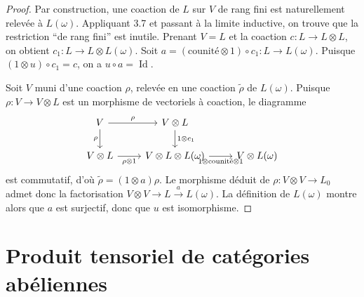 \documentclass[12pt,a4paper]{article}
\theoremstyle{plain}
\theoremstyle{definition}
\theoremstyle{remark}
\DeclareMathOperator{\Id}{Id}
\begin{document}
\begin{proof}
Par construction, une coaction de $L$ sur $V$ de rang fini est naturellement relevée à $L(\omega)$. Appliquant 3.7 et passant à la limite inductive, on trouve que la restriction ``de rang fini'' est inutile. Prenant $V = L$ et la coaction $c : L \to L \otimes L$, on obtient $c_1 : L \to L \otimes L(\omega)$. Soit $a = (\text{counité} \otimes 1) \circ c_1 : L \to L(\omega)$. Puisque $(1 \otimes u) \circ c_1 = c$, on a $u \circ a = \Id$.

Soit $V$ muni d'une coaction $\rho$, relevée en une coaction $\tilde{\rho}$ de $L(\omega)$. Puisque $\rho : V \to V \otimes L$ est un morphisme de vectoriels à coaction, le diagramme
\[
\begin{tikzcd}
V \arrow[r, "\rho"] \arrow[d, "\rho"'] & V \otimes L \arrow[d, "1 \otimes c_1"] \\
V \otimes L \arrow[r, "\rho \otimes 1"'] & V \otimes L \otimes L(\omega) \arrow[r, "1 \otimes \text{counité} \otimes 1"'] & V \otimes L(\omega)
\end{tikzcd}
\]
est commutatif, d'où $\tilde{\rho} = (1 \otimes a)\rho$. Le morphisme déduit de $\rho : V \otimes V \to L_0$ admet donc la factorisation $V \otimes V \to L \xrightarrow{a} L(\omega)$. La définition de $L(\omega)$ montre alors que $a$ est surjectif, donc que $u$ est isomorphisme.
\end{proof}


\section{Produit tensoriel de catégories abéliennes}

\subsection{}
\end{document}
